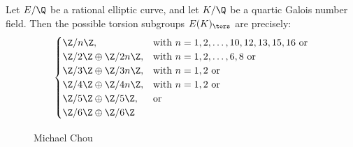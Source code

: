 




\begin{frame}[plain]
\small
\begin{thm}[Chou, 2015]
Let $E/\Q$ be a rational elliptic curve, and let $K/\Q$ be a quartic Galois number field. Then the possible torsion subgroups $E(K)_\tors$ are precisely:
	\[
	\begin{cases}
	\Z/n\Z, & \text{with } n= 1, 2, \ldots, 10, 12, 13, 15, 16 \text{ or} \\
	\Z/2\Z \oplus \Z/2n\Z, & \text{with } n= 1, 2, \ldots, 6, 8 \text{ or} \\
	\Z/3\Z \oplus \Z/3n\Z, & \text{with } n= 1, 2 \text{ or} \\
	\Z/4\Z \oplus \Z/4n\Z, & \text{with } n= 1, 2 \text{ or} \\
	\Z/5\Z \oplus \Z/5\Z, & \text{or} \\
	\Z/6\Z \oplus \Z/6\Z 
	\end{cases}
	\]
\end{thm}
	\begin{figure}[!ht]
	\centering
	\captionsetup{labelformat=empty}
	\caption{Michael Chou}
	\end{figure}
\end{frame}





